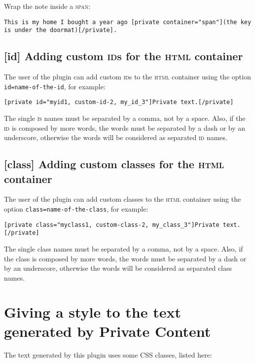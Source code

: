 \documentclass[a4paper,11pt]{article}
\begin{document}
Wrap the note inside a \textsc{span}:

\begin{lstlisting}
This is my home I bought a year ago [private container="span"](the key is under the doormat)[/private].
\end{lstlisting}


\subsection{[id] Adding custom \textsc{id}s for the \textsc{html} container}

The user of the plugin can add custom \textsc{id}s to the \textsc{html} container using the option \verb+id=name-of-the-id+, for example:

\begin{lstlisting}
[private id="myid1, custom-id-2, my_id_3"]Private text.[/private]
\end{lstlisting}

The single \textsc{is} names must be separated by a comma, not by a space. Also, if the \textsc{id} is composed by more words, the words must be separated by a dash or by an underscore, otherwise the words will be considered as separated \textsc{id} names.

\subsection{[class] Adding custom classes for the \textsc{html} container}

The user of the plugin can add custom classes to the \textsc{html} container using the option \verb+class=name-of-the-class+, for example:

\begin{lstlisting}
[private class="myclass1, custom-class-2, my_class_3"]Private text.[/private]
\end{lstlisting}

The single class names must be separated by a comma, not by a space. Also, if the class is composed by more words, the words must be separated by a dash or by an underscore, otherwise the words will be considered as separated class names.

\section{Giving a style to the text generated by Private Content}

The text generated by this plugin uses some CSS classes, listed here:
\end{document}
